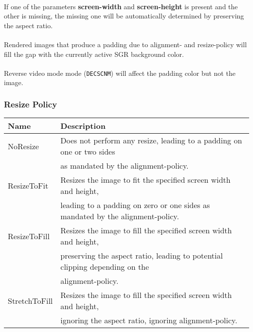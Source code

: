 \documentclass[a4paper]{article}
\newcommand{\code}[1]{\colorbox{light-gray}{\texttt{#1}}}
\begin{document}
\paragraph*{}
If one of the parameters \textbf{screen-width} and \textbf{screen-height} is present and the other is
missing, the missing one will be automatically determined by preserving the aspect ratio.

\paragraph*{}
Rendered images that produce a padding due to alignment- and resize-policy will fill the gap with the
currently active SGR background color.

\paragraph*{}
Reverse video mode mode (\code{DECSCNM}) will affect the padding color but not the image.

\subsubsection*{Resize Policy}

\begin{tabular}{ |l|l| }
    \hline
    \textbf{Name}          & \textbf{Description} \\
    \hline
    NoResize      & Does not perform any resize, leading to a padding on one or two sides \\
                  & as mandated by the alignment-policy. \\
    ResizeToFit   & Resizes the image to fit the specified screen width and height, \\
                  & leading to a padding on zero or one sides as mandated by the alignment-policy. \\
    ResizeToFill  & Resizes the image to fill the specified screen width and height, \\
                  & preserving the aspect ratio, leading to potential clipping depending on the \\
                  & alignment-policy. \\
    StretchToFill & Resizes the image to fill the specified screen width and height, \\
                  & ignoring the aspect ratio, ignoring alignment-policy. \\
    \hline
\end{tabular}
\end{document}
